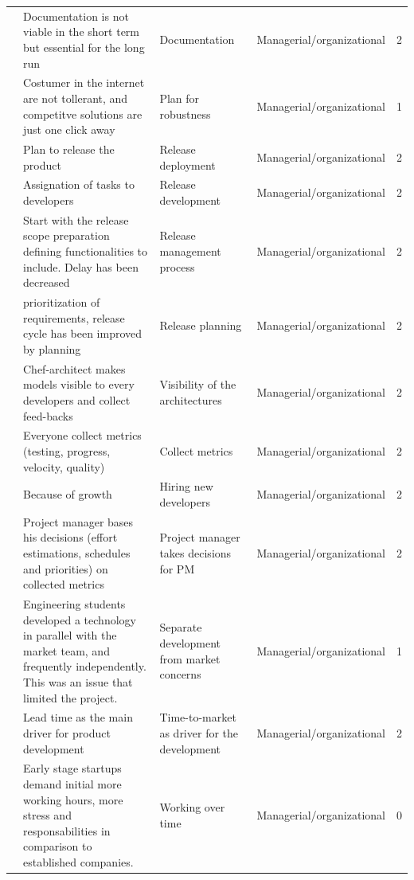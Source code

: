 \documentclass[final,5p,times,twocolumn]{elsarticle}
\begin{document}
\begin{center}
\begin{longtable}{|p{0.4in}|p{3in}|p{1.3in}|p{1in}|p{0.3in}|}
\cite{Zettel2001} & Documentation is not viable in the short term but essential for the long run & Documentation & Managerial/organizational & 2 \\
\cite{Mater2000} & Costumer in the internet are not tollerant, and competitve solutions are just one click away & Plan for robustness & Managerial/organizational & 1 \\
\cite{Kajko-Mattsson2008} & Plan to release the product & Release deployment & Managerial/organizational & 2 \\
\cite{Kajko-Mattsson2008} & Assignation of tasks to developers & Release development & Managerial/organizational & 2 \\
\cite{Kajko-Mattsson2008} & Start with the release scope preparation defining functionalities to include. Delay has been decreased & Release management process & Managerial/organizational & 2 \\
\cite{Kajko-Mattsson2008} & prioritization of requirements, release cycle has been improved by planning & Release planning & Managerial/organizational & 2 \\
\cite{Ambler2002} & Chef-architect makes models visible to every developers and collect feed-backs & Visibility of the architectures & Managerial/organizational & 2 \\
\cite{Zettel2001} & Everyone collect metrics (testing, progress, velocity, quality) & Collect metrics & Managerial/organizational & 2 \\
\cite{Ambler2002} & Because of growth & Hiring new developers & Managerial/organizational & 2 \\
\cite{Zettel2001} & Project manager bases his decisions (effort estimations, schedules and priorities) on collected metrics & Project manager takes decisions for PM & Managerial/organizational & 2 \\
\cite{Stanfill2007} & Engineering students developed a technology in parallel with the market team, and frequently independently. This was an issue that limited the project. & Separate development from market concerns & Managerial/organizational & 1 \\
\cite{Hilmola2003} & Lead time as the main driver for product development & Time-to-market as driver for the development & Managerial/organizational & 2 \\
\cite{Tanabian2005} & Early stage startups demand initial more working hours, more stress and responsabilities in comparison to established companies. & Working over time & Managerial/organizational & 0 \\

\end{longtable}
\end{center}
\end{document}
